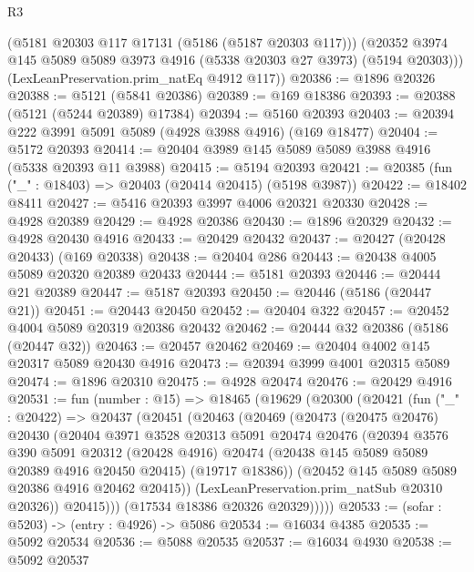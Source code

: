 \begin{lexlean}{R3}
\begin{coremodule}
        (@5181 @20303 @117 @17131 (@5186 (@5187 @20303 @117)))
        (@20352 @3974 @145 @5089 @5089 @3973 @4916 (@5338 @20303 @27 @3973) (@5194 @20303)))
      (LexLeanPreservation.prim_natEq @4912 @117))
@20386 := @1896 @20326
@20388 := @5121 (@5841 @20386)
@20389 := @169 @18386
@20393 := @20388 (@5121 (@5244 @20389) @17384)
@20394 := @5160 @20393
@20403 := @20394 @222 @3991 @5091 @5089 (@4928 @3988 @4916) (@169 @18477)
@20404 := @5172 @20393
@20414 := @20404 @3989 @145 @5089 @5089 @3988 @4916 (@5338 @20393 @11 @3988)
@20415 := @5194 @20393
@20421 := @20385 (fun ("_" : @18403) => @20403 (@20414 @20415) (@5198 @3987))
@20422 := @18402 @8411
@20427 := @5416 @20393 @3997 @4006 @20321 @20330
@20428 := @4928 @20389
@20429 := @4928 @20386
@20430 := @1896 @20329
@20432 := @4928 @20430 @4916
@20433 := @20429 @20432
@20437 := @20427 (@20428 @20433) (@169 @20338)
@20438 := @20404 @286
@20443 := @20438 @4005 @5089 @20320 @20389 @20433
@20444 := @5181 @20393
@20446 := @20444 @21 @20389
@20447 := @5187 @20393
@20450 := @20446 (@5186 (@20447 @21))
@20451 := @20443 @20450
@20452 := @20404 @322
@20457 := @20452 @4004 @5089 @20319 @20386 @20432
@20462 := @20444 @32 @20386 (@5186 (@20447 @32))
@20463 := @20457 @20462
@20469 := @20404 @4002 @145 @20317 @5089 @20430 @4916
@20473 := @20394 @3999 @4001 @20315 @5089
@20474 := @1896 @20310
@20475 := @4928 @20474
@20476 := @20429 @4916
@20531 := fun (number : @15) =>
  @18465
    (@19629
      (@20300
        (@20421
          (fun ("_" : @20422) =>
          @20437
            (@20451
              (@20463
                (@20469
                  (@20473
                    (@20475 @20476)
                    @20430
                    (@20404
                      @3971
                      @3528
                      @20313
                      @5091
                      @20474
                      @20476
                      (@20394
                        @3576
                        @390
                        @5091
                        @20312
                        (@20428 @4916)
                        @20474
                        (@20438 @145 @5089 @5089 @20389 @4916 @20450 @20415)
                        (@19717 @18386))
                      (@20452 @145 @5089 @5089 @20386 @4916 @20462 @20415))
                    (LexLeanPreservation.prim_natSub @20310 @20326))
                  @20415)))
            (@17534 @18386 @20326 @20329)))))
@20533 := (sofar : @5203) -> (entry : @4926) -> @5086
@20534 := @16034 @4385
@20535 := @5092 @20534
@20536 := @5088 @20535
@20537 := @16034 @4930
@20538 := @5092 @20537

\end{coremodule}
\end{lexlean}
